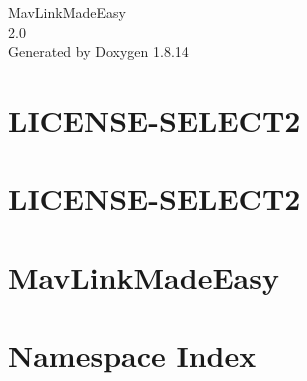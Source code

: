 \documentclass[twoside]{book}
\newcommand{\+}{\discretionary{\mbox{\scriptsize$\hookleftarrow$}}{}{}}
\newcommand{\clearemptydoublepage}{%
  \newpage{\pagestyle{empty}\cleardoublepage}%
}
\begin{document}
\hypersetup{pageanchor=false,
             bookmarksnumbered=true,
             pdfencoding=unicode
            }
\begin{titlepage}
\vspace*{7cm}
\begin{center}%
{\Large Mav\+Link\+Made\+Easy \\[1ex]\large 2.\+0 }\\
\vspace*{1cm}
{\large Generated by Doxygen 1.8.14}\\
\end{center}
\end{titlepage}
\clearemptydoublepage
{}
\tableofcontents
\clearemptydoublepage
{}
\hypersetup{pageanchor=true}

\chapter{L\+I\+C\+E\+N\+S\+E-\/\+S\+E\+L\+E\+C\+T2}
\label{md_C_1_Users_lauren_PycharmProjects_MavLinkMadeEasy_mavAgenda_static_admin_css_vendor_select2_LICENSE-SELECT2}

\chapter{L\+I\+C\+E\+N\+S\+E-\/\+S\+E\+L\+E\+C\+T2}
\label{md_C_1_Users_lauren_PycharmProjects_MavLinkMadeEasy_mavAgenda_static_admin_js_vendor_select2_LICENSE-SELECT2}

\chapter{Mav\+Link\+Made\+Easy}
\label{md_C_1_Users_lauren_PycharmProjects_MavLinkMadeEasy_README}

\chapter{Namespace Index}

\end{document}

